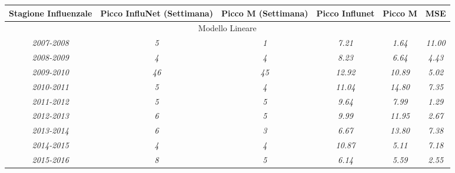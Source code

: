 \begin{table}[p]
\centering
\begin{adjustbox}{max width=\textwidth}
\begin{tabular}{|c|c|c|c|c|c|}
\hline
\rowcolor[HTML]{EFEFEF} 
\textbf{Stagione Influenzale} & \textbf{Picco InfluNet (Settimana)} & \textbf{Picco M (Settimana)} & \textbf{Picco Influnet} & \textbf{Picco M} & \textbf{MSE}   \\ \hline
\multicolumn{6}{|c|}{\cellcolor[HTML]{EFEFEF}Modello Lineare} \\ \hline
\textit{2007-2008}            & \textit{5}                          & \textit{1}                    & \textit{7.21}           & \textit{1.64}     & \textit{11.00} \\ \hline
\rowcolor[HTML]{FFFFFF} 
\textit{2008-2009}            & \textit{4}                          & \textit{4}                    & \textit{8.23}           & \textit{6.64}     & \textit{4.43}  \\ \hline
\rowcolor[HTML]{FFFFFF} 
\textit{2009-2010}            & \textit{46}                         & \textit{45}                   & \textit{12.92}          & \textit{10.89}    & \textit{5.02}  \\ \hline
\rowcolor[HTML]{FFFFFF} 
\textit{2010-2011}            & \textit{5}                          & \textit{4}                    & \textit{11.04}          & \textit{14.80}    & \textit{7.35}  \\ \hline
\rowcolor[HTML]{FFFFFF} 
\textit{2011-2012}            & \textit{5}                          & \textit{5}                    & \textit{9.64}           & \textit{7.99}     & \textit{1.29}  \\ \hline
\rowcolor[HTML]{FFFFFF} 
\textit{2012-2013}            & \textit{6}                          & \textit{5}                    & \textit{9.99}           & \textit{11.95}    & \textit{2.67}  \\ \hline
\rowcolor[HTML]{FFFFFF} 
\textit{2013-2014}            & \textit{6}                          & \textit{3}                    & \textit{6.67}           & \textit{13.80}    & \textit{7.38}  \\ \hline
\rowcolor[HTML]{FFFFFF} 
\textit{2014-2015}            & \textit{4}                          & \textit{4}                    & \textit{10.87}          & \textit{5.11}     & \textit{7.18}  \\ \hline
\rowcolor[HTML]{FFFFFF} 
\textit{2015-2016}            & \textit{8}                          & \textit{5}                    & \textit{6.14}           & \textit{5.59}     & \textit{2.55}  \\ \hline

\end{tabular}
\end{adjustbox}
\end{table}
